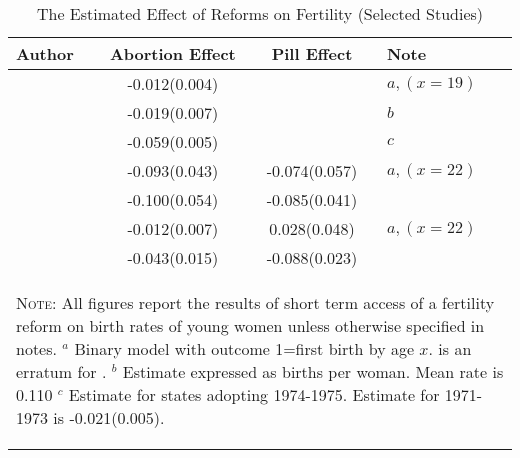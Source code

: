 \begin{table}[htpb!]
\caption{The Estimated Effect of Reforms on Fertility (Selected Studies)}
\begin{tabular}{lccl} \toprule
Author & Abortion Effect & Pill Effect & Note \\ \midrule
\citet{AngristEvans1996}      & -0.012(0.004) &               & $a,(x=19)$   \\
\citet{Levineetal1996}        & -0.019(0.007) &               & $b$          \\
\citet{Gruberetal1999}        & -0.059(0.005) &               & $c$          \\
\citet{Bailey2006}            & -0.093(0.043) & -0.074(0.057) & $a,(x=22)$ \\
\citet{Guldi2008}             & -0.100(0.054) & -0.085(0.041) &              \\
\citet{Bailey2009}            & -0.012(0.007) &  0.028(0.048) & $a,(x=22)$ \\
\citet{OltmansHungerman2012}  & -0.043(0.015) & -0.088(0.023) &              \\
\bottomrule
\multicolumn{4}{p{12.2cm}}{\begin{footnotesize}\textsc{Note:} All figures report 
the results of short term access of a fertility reform on birth rates of young 
women unless otherwise specified in notes. \newline 
$^a$ Binary model with outcome 1=first birth by age $x$. \citet{Bailey2009} is
an erratum for \citeyear{Bailey2006}.\newline
$^b$ Estimate expressed as births per woman.  Mean rate is 0.110 \newline 
$^c$ Estimate for states adopting 1974-1975. Estimate for 1971-1973 is 
-0.021(0.005). %
\end{footnotesize}} \\
\end{tabular}
\end{table}

